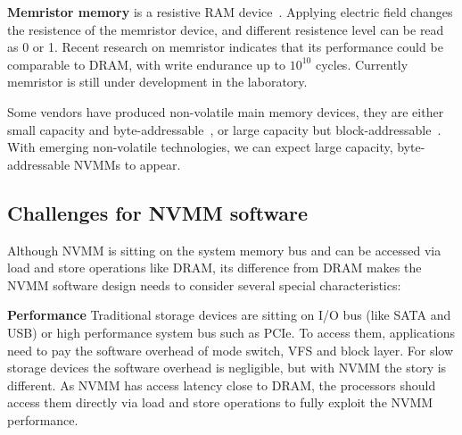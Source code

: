 \textbf{Memristor memory} is a resistive RAM device~\cite{memristor}.
Applying electric field
changes the resistence of the memristor device, and different resistence level
can be read as 0 or 1. Recent research on memristor indicates that its
performance could be comparable to DRAM, with write endurance up to $10^{10}$
cycles. Currently memristor is still under development in the laboratory.
 
Some vendors have produced non-volatile main memory devices, they are
either small capacity and byte-addressable~\cite{micron-nvdimm},
or large capacity but block-addressable~\cite{smart-system}.
With emerging non-volatile technologies, we can expect
large capacity, byte-addressable NVMMs to appear.

\begin{table}
	\vspace*{1mm}
	\caption{}
	\label{table:techtrend}
\end{table}

\subsection{Challenges for NVMM software}
\label{sec:challenge}

Although NVMM is sitting on the system memory bus and can be accessed
via load and store operations like DRAM, its difference from DRAM
makes the NVMM software design needs to consider several special
characteristics:

\textbf{Performance} Traditional storage devices are sitting on I/O bus
(like SATA and USB) or high performance system bus such as PCIe. To access
them, applications need to pay the software overhead of mode switch, VFS and
block layer. For slow storage devices the software overhead is negligible,
but with NVMM the story is different. As NVMM has access latency close to
DRAM, the processors should access them directly via load and store
operations to fully exploit the NVMM performance.

